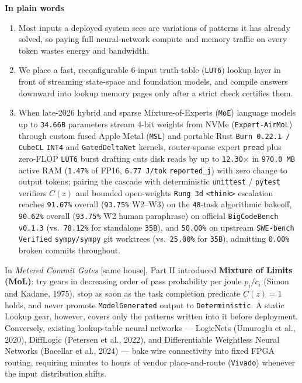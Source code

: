 \documentclass[10pt]{article}
\begin{document}
\textbf{In plain words}
\begin{enumerate}
  \item Most inputs a deployed system sees are variations of patterns it has already solved, so paying full neural-network compute and memory traffic on every token wastes energy and bandwidth.
  \item We place a fast, reconfigurable 6-input truth-table (\texttt{LUT6}) lookup layer in front of streaming state-space and foundation models, and compile answers downward into lookup memory pages only after a strict check certifies them.
  \item When late-2026 hybrid and sparse Mixture-of-Experts (\texttt{MoE}) language models up to \texttt{34.66B} parameters stream 4-bit weights from NVMe (\texttt{Expert-AirMoL}) through custom fused Apple Metal (\texttt{MSL}) and portable Rust \texttt{Burn 0.22.1 / CubeCL} \texttt{INT4} and \texttt{GatedDeltaNet} kernels, router-sparse expert \texttt{pread} plus zero-FLOP \texttt{LUT6} burst drafting cuts disk reads by up to \texttt{12.30$\times$} in \texttt{970.0 MB} active RAM (\texttt{1.47\%} of FP16, \texttt{6.77 J/tok} \texttt{reported\_j}) with zero change to output tokens; pairing the cascade with deterministic \texttt{unittest} / \texttt{pytest} verifiers $C(z)$ and bounded open-weights \texttt{Rung 3d} \texttt{<think>} escalation reaches \texttt{91.67\%} overall (\texttt{93.75\%} W2--W3) on the \texttt{48}-task algorithmic bakeoff, \texttt{90.62\%} overall (\texttt{93.75\%} W2 human paraphrase) on official \texttt{BigCodeBench v0.1.3} (vs.\ \texttt{78.12\%} for standalone \texttt{35B}), and \texttt{50.00\%} on upstream \texttt{SWE-bench Verified} \texttt{sympy/sympy} git worktrees (vs.\ \texttt{25.00\%} for \texttt{35B}), admitting \texttt{0.00\%} broken commits throughout.
\end{enumerate}

In \emph{Metered Commit Gates} [same house], Part II introduced \textbf{Mixture of Limits (MoL)}: try gears in decreasing order of pass probability per joule $p_i / c_i$ (Simon and Kadane, 1975), stop as soon as the task completion predicate $C(z) = 1$ holds, and never promote \texttt{ModelGenerated} output to \texttt{Deterministic}. A static Lookup gear, however, covers only the patterns written into it before deployment. Conversely, existing lookup-table neural networks --- LogicNets (Umuroglu et al., 2020), DiffLogic (Petersen et al., 2022), and Differentiable Weightless Neural Networks (Bacellar et al., 2024) --- bake wire connectivity into fixed FPGA routing, requiring minutes to hours of vendor place-and-route (\texttt{Vivado}) whenever the input distribution shifts.
\end{document}
